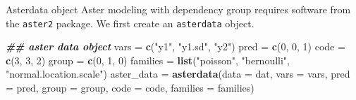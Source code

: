 \documentclass[
  ignorenonframetext,
]{beamer}
\newenvironment{Shaded}{\begin{snugshade}}{\end{snugshade}}
\newcommand{\AttributeTok}[1]{\textcolor[rgb]{0.13,0.29,0.53}{#1}}
\newcommand{\DecValTok}[1]{\textcolor[rgb]{0.00,0.00,0.81}{#1}}
\newcommand{\DocumentationTok}[1]{\textcolor[rgb]{0.56,0.35,0.01}{\textbf{\textit{#1}}}}
\newcommand{\FunctionTok}[1]{\textcolor[rgb]{0.13,0.29,0.53}{\textbf{#1}}}
\newcommand{\NormalTok}[1]{#1}
\newcommand{\OtherTok}[1]{\textcolor[rgb]{0.56,0.35,0.01}{#1}}
\newcommand{\StringTok}[1]{\textcolor[rgb]{0.31,0.60,0.02}{#1}}
\begin{document}
\begin{frame}[fragile]{Asterdata object}
\protect\hypertarget{asterdata-object}{}
Aster modeling with dependency group requires software from the
\texttt{aster2} package. We first create an \texttt{asterdata} object.

\vspace{5pt}
\tiny

\begin{Shaded}
\begin{Highlighting}[]
\DocumentationTok{\#\# aster data object}
\NormalTok{vars }\OtherTok{=} \FunctionTok{c}\NormalTok{(}\StringTok{"y1"}\NormalTok{, }\StringTok{"y1.sd"}\NormalTok{, }\StringTok{"y2"}\NormalTok{)}
\NormalTok{pred }\OtherTok{=} \FunctionTok{c}\NormalTok{(}\DecValTok{0}\NormalTok{, }\DecValTok{0}\NormalTok{, }\DecValTok{1}\NormalTok{)}
\NormalTok{code }\OtherTok{=} \FunctionTok{c}\NormalTok{(}\DecValTok{3}\NormalTok{, }\DecValTok{3}\NormalTok{, }\DecValTok{2}\NormalTok{)}
\NormalTok{group }\OtherTok{=} \FunctionTok{c}\NormalTok{(}\DecValTok{0}\NormalTok{, }\DecValTok{1}\NormalTok{, }\DecValTok{0}\NormalTok{)}
\NormalTok{families }\OtherTok{=} \FunctionTok{list}\NormalTok{(}\StringTok{"poisson"}\NormalTok{, }\StringTok{"bernoulli"}\NormalTok{, }\StringTok{"normal.location.scale"}\NormalTok{)}
\NormalTok{aster\_data }\OtherTok{=} \FunctionTok{asterdata}\NormalTok{(}\AttributeTok{data =}\NormalTok{ dat, }\AttributeTok{vars =}\NormalTok{ vars, }\AttributeTok{pred =}\NormalTok{ pred, }
                       \AttributeTok{group =}\NormalTok{ group, }\AttributeTok{code =}\NormalTok{ code, }
                       \AttributeTok{families =}\NormalTok{ families)}
\end{Highlighting}
\end{Shaded}
\end{frame}
\end{document}

